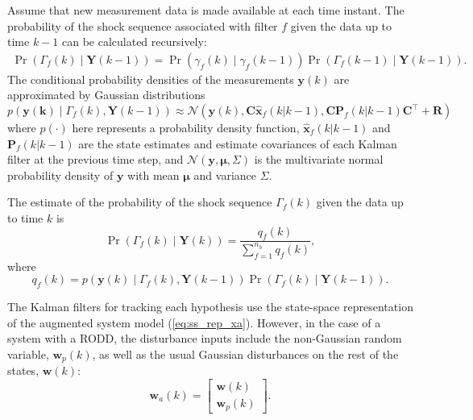 Assume that new measurement data is made available at each time instant. The probability of the shock sequence associated with filter $f$ given the data up to time $k-1$ can be calculated recursively:
\begin{multline} \label{eq:Pr_Gammakp1_given_Yk}
	\Pr(\Gamma_f(k) \mid \mathbf{Y}(k-1)) = 
	\Pr(\gamma_f(k) \mid \gamma_f(k-1)) \Pr(\Gamma_f(k-1) \mid \mathbf{Y}(k-1)).
\end{multline}
The conditional probability densities of the measurements $\mathbf{y}(k)$ are approximated by Gaussian distributions
\begin{equation} \label{eq:p_yk_given_Gammak_Ykm1}
	p(\mathbf{y(k)} \mid \Gamma_f(k), \mathbf{Y}(k-1)) \approx
	\mathcal{N}\left(\mathbf{y}(k), \mathbf{C} \mathbf{\hat{x}}_{f}(k|k-1), \mathbf{C} \mathbf{P}_f(k|k-1) \mathbf{C}^\intercal+\mathbf{R}\right)
\end{equation}
where $p(\cdot)$ here represents a probability density function, $\mathbf{\hat{x}}_{f}(k|k-1)$ and $\mathbf{P}_f(k|k-1)$ are the state estimates and estimate covariances of each Kalman filter at the previous time step, and $\mathcal{N}(\mathbf{y}, \mathbf{\mu}, \Sigma)$ is the multivariate normal probability density of $\mathbf{y}$ with mean $\mathbf{\mu}$ and variance $\Sigma$.

The estimate of the probability of the shock sequence $\Gamma_f(k)$ given the data up to time $k$ is
\begin{equation} \label{eq:Pr_Gammak_given_Yk}
	\Pr(\Gamma_f(k) \mid \mathbf{Y}(k)) = \frac{q_f(k)}{\sum_{f=1}^{n_h} q_f(k)},
\end{equation}
where
\begin{equation} \label{eq:qfk}
	q_f(k) = p(\mathbf{y}(k) \mid \Gamma_f(k), \mathbf{Y}(k-1)) \Pr(\Gamma_f(k) \mid \mathbf{Y}(k-1)).
\end{equation}

The Kalman filters for tracking each hypothesis use the state-space representation of the augmented system model (\ref{eq:ss_rep_xa}). 
However, in the case of a system with a RODD, the disturbance inputs include the non-Gaussian random variable, $\mathbf{w}_p(k)$, as well as the usual Gaussian disturbances on the rest of the states, $\mathbf{w}(k)$:
\begin{equation} \label{eq:wak}
	\mathbf{w}_a(k) = \begin{bmatrix}
		\mathbf{w}(k) \\
		\mathbf{w}_p(k)
	\end{bmatrix}.
\end{equation}

